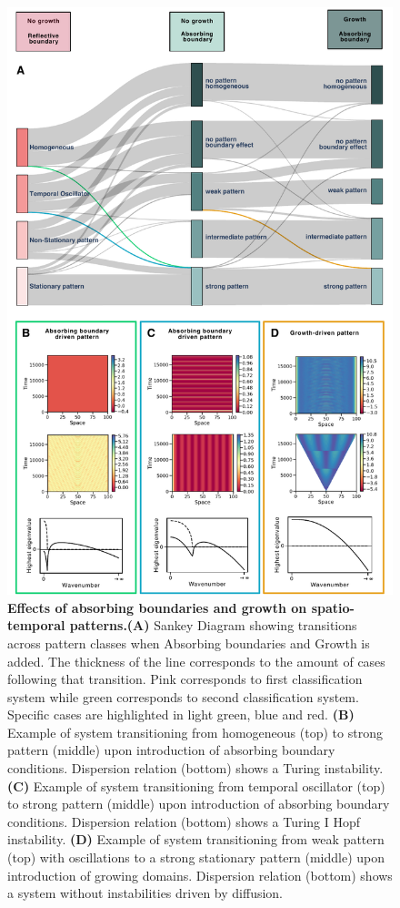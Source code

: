 \documentclass[10pt,letterpaper]{article}
\begin{document}
\begin{figure}[H]
    \includegraphics[width=1\textwidth]{figures/boundaries_growth} %
    \caption{\textbf{Effects of absorbing boundaries and growth on spatio-temporal patterns.}\textbf{(A)} Sankey Diagram showing transitions across pattern classes when Absorbing boundaries and Growth is added. The thickness of the line corresponds to the amount of cases following that transition. Pink corresponds to first classification system while green corresponds to second classification system. Specific cases are highlighted in light green, blue and red. \textbf{(B)} Example of system transitioning from homogeneous (top) to strong pattern (middle) upon introduction of absorbing boundary conditions. Dispersion relation (bottom) shows a Turing instability. \textbf{(C)} Example of system transitioning from temporal oscillator (top) to strong pattern (middle) upon introduction of absorbing boundary conditions. Dispersion relation (bottom) shows a Turing I Hopf instability. \textbf{(D)} Example of system transitioning from weak pattern (top) with oscillations to a strong stationary pattern (middle) upon introduction of growing domains. Dispersion relation (bottom) shows a system without instabilities driven by diffusion.  }
    \label{fig:boundariesgrowth} %
\end{figure}
\end{document}
